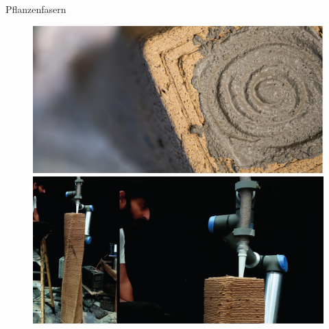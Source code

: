 \documentclass{beamer}
\begin{document}
\begin{frame}{Pflanzenfasern}
    \begin{figure}[H]
        \begin{minipage}{0.45\textwidth}
           \centering
           \vfill
           \includegraphics[width=\linewidth]{figures/beispiele/kahn-2023-1.jpg}
           \caption{\parencite{kahn2023}}
           \label{fig:kahn-1}
        \end{minipage}
            \hfill
        \begin{minipage}{0.45\textwidth}
           \centering
           \vfill
           \includegraphics[width=\linewidth]{figures/beispiele/kahn-2023-2.jpg}
       \caption{\parencite{kahn2023}}
           \label{fig:kahn-2}
        \end{minipage}
    \end{figure}
\end{frame}
\end{document}
